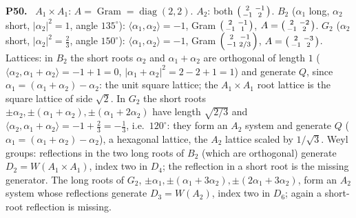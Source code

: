 \documentclass[11pt]{article}
\newenvironment{solution}[1]{\medskip\noindent\textbf{P#1.}\ }{\par\medskip}
\begin{document}
\begin{solution}{50}
$A_1\times A_1$: $A = \operatorname{Gram} = \operatorname{diag}(2,2)$.
$A_2$: both $\begin{psmallmatrix}2&-1\\-1&2\end{psmallmatrix}$. $B_2$
($\alpha_1$ long, $\alpha_2$ short, $|\alpha_2|^2 = 1$, angle $135^\circ$):
$\langle\alpha_1,\alpha_2\rangle = -1$, Gram
$\begin{psmallmatrix}2&-1\\-1&1\end{psmallmatrix}$,
$A = \begin{psmallmatrix}2&-2\\-1&2\end{psmallmatrix}$. $G_2$ ($\alpha_2$
short, $|\alpha_2|^2 = \tfrac23$, angle $150^\circ$):
$\langle\alpha_1,\alpha_2\rangle = -1$, Gram
$\begin{psmallmatrix}2&-1\\-1&2/3\end{psmallmatrix}$,
$A = \begin{psmallmatrix}2&-3\\-1&2\end{psmallmatrix}$. Lattices: in $B_2$
the short roots $\alpha_2$ and $\alpha_1+\alpha_2$ are orthogonal of
length $1$ ($\langle\alpha_2,\alpha_1+\alpha_2\rangle = -1+1 = 0$,
$|\alpha_1+\alpha_2|^2 = 2-2+1 = 1$) and generate $Q$, since
$\alpha_1 = (\alpha_1+\alpha_2)-\alpha_2$: the unit square lattice; the
$A_1\times A_1$ root lattice is the square lattice of side $\sqrt2$. In $G_2$
the short roots $\pm\alpha_2,\pm(\alpha_1+\alpha_2),\pm(\alpha_1+2\alpha_2)$
have length $\sqrt{2/3}$ and $\langle\alpha_2,\alpha_1+\alpha_2\rangle = -1+\tfrac23 = -\tfrac13$,
i.e.\ $120^\circ$: they form an $A_2$ system and generate $Q$
($\alpha_1 = (\alpha_1+\alpha_2)-\alpha_2$), a hexagonal lattice, the $A_2$
lattice scaled by $1/\sqrt3$. Weyl groups: reflections in the two long
roots of $B_2$ (which are orthogonal) generate $D_2 = W(A_1\times A_1)$,
index two in $D_4$; the reflection in a short root is the missing
generator. The long roots of $G_2$, $\pm\alpha_1,\pm(\alpha_1+3\alpha_2),\pm(2\alpha_1+3\alpha_2)$,
form an $A_2$ system whose reflections generate $D_3 = W(A_2)$, index two
in $D_6$; again a short-root reflection is missing.
\end{solution}
\end{document}

